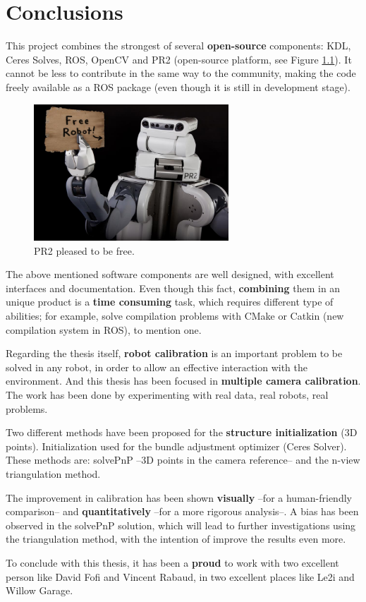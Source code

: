 \chapter{Conclusions}
\label{cha:conclusions}

This project combines the strongest of several \textbf{open-source} components: KDL, Ceres Solves, ROS, OpenCV and PR2 (open-source platform, see Figure \ref{fig:PR2_free_robot}). It cannot be less to contribute in the same way to the community, making the code freely available as a ROS package (even though it is still in development stage).

\begin{figure}[!htbp]
 \centering
 \includegraphics[width=0.65\textwidth]{images/PR2_free_robot.jpg}
 \caption{PR2 pleased to be free.}
 \label{fig:PR2_free_robot}
\end{figure}

The above mentioned software components are well designed, with excellent interfaces and documentation. Even though this fact, \textbf{combining} them in an unique product is a \textbf{time consuming} task, which requires different type of abilities; for example, solve compilation problems with CMake or Catkin (new compilation system in ROS), to mention one.

Regarding the thesis itself, \textbf{robot calibration} is an important problem to be solved in any robot, in order to allow an effective interaction with the environment. And this thesis has been focused in \textbf{multiple camera calibration}. The work has been done by experimenting with real data, real robots, real problems.

Two different methods have been proposed for the \textbf{structure initialization} (3D points). Initialization used for the bundle adjustment optimizer (Ceres Solver). These methods are: solvePnP --3D points in the camera reference-- and the n-view triangulation method.

The improvement in calibration has been shown \textbf{visually} --for a human-friendly comparison-- and \textbf{quantitatively} --for a more rigorous analysis--. A bias has been observed in the solvePnP solution, which will lead to further investigations using the triangulation method, with the intention of improve the results even more.


To conclude with this thesis, it has been a \textbf{proud} to work with two excellent person like David Fofi and Vincent Rabaud, in two excellent places like Le2i and Willow Garage.
